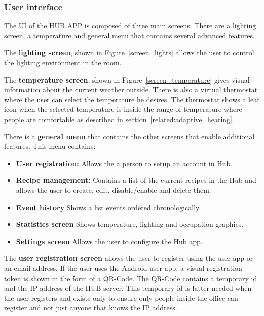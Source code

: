 \subsubsection{User interface}


The \ac{UI} of the HUB APP is composed of three main screens. There are a lighting screen, a temperature and general menu that contains several advanced features.

The \textbf{lighting screen}, shown in Figure~\ref{screen_lights} allows the user to control the lighting environment in the room.

The \textbf{temperature screen}, shown in Figure~\ref{screen_temperature} gives visual information about the current weather outside. There is also a virtual thermostat where the user can select the temperature he desires. The thermostat shows a leaf icon when the selected temperature is inside the range of temperature where people are comfortable as described in section~\ref{related:adaptive_heating}. 

There is a \textbf{general menu} that contains the other screens that enable additional features. This menu contains:
\begin{itemize}
  \item \textbf{User registration:} Allows the a person to setup an account in Hub. 
  \item \textbf{Recipe management:} Contains a list of the current recipes in the Hub and allows the user to create, edit, disable/enable and delete them.
  
  \item \textbf{Event history} Shows a list events ordered chronologically. 
  
  \item \textbf{Statistics screen} Shows temperature, lighting and occupation graphics. 
  
  \item \textbf{Settings screen} Allows the user to configure the Hub app.
\end{itemize}



The \textbf{user registration screen} allows the user to register using the user app or an email address.
If the user uses the Android user app, a visual registration token is shown in the form of a QR-Code. The QR-Code contains a temporary id and the IP address of the HUB server. This temporary id is latter needed when the user registers and exists  only to ensure only people inside the office can register and not just anyone that knows the IP address.


